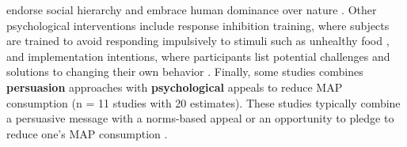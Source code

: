 \documentclass[sn-nature,referee,pdflatex]{sn-jnl}
\begin{document}
endorse social hierarchy and embrace human dominance over nature
\citep{allen2002}. Other psychological interventions include response
inhibition training, where subjects are trained to avoid responding
impulsively to stimuli such as unhealthy food \citep{camp2019}, and
implementation intentions, where participants list potential challenges
and solutions to changing their own behavior
\citep{aberman2018, shreedhar2021}. Finally, some studies combines
\textbf{persuasion} approaches with \textbf{psychological} appeals to
reduce MAP consumption
\citep{aberman2018, berndsen2005, bertolaso2015, carfora2023, fehrenbach2015, hennessy2016, mathur2021effectiveness, mattson2020, piester2020, shreedhar2021}
(n = 11 studies with 20 estimates). These studies typically combine a
persuasive message with a norms-based appeal
\citep{piester2020, mattson2020} or an opportunity to pledge to reduce
one's MAP consumption \citep{mathur2021effectiveness, shreedhar2021}.
\end{document}
